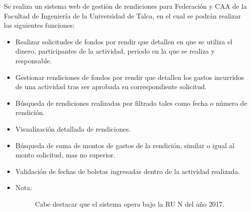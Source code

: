 Se realiza un sistema web de gestión de rendiciones para Federación y CAA de la Facultad de Ingeniería de la Universidad de Talca, en el cual se podrán realizar las siguientes funciones:

\begin{itemize}
	\item Realizar solicitudes de fondos por rendir que detallen en que se utiliza el dinero, participantes de la actividad, periodo en la que se realiza y responsable.

	\item Gestionar rendiciones de fondos por rendir que detallen los gastos incurridos de una actividad tras ser aprobada su correspondiente solicitud.
	
	\item Búsqueda de rendiciones realizadas por filtrado tales como fecha o número de rendición.
	
	\item Visualización detallada de rendiciones.
	
	\item Búsqueda de suma de montos de gastos de la rendición, similar o igual al monto solicitud, mas no superior.
	
	\item Validación de fechas de boletas ingresadas dentro de la actividad realizada.
\end{itemize}

\begin{itemize}
	\item 	\begin{description}
			    \item[Nota:] Cabe destacar que el sistema opera bajo la RU N del año 2017.
			\end{description}
\end{itemize}